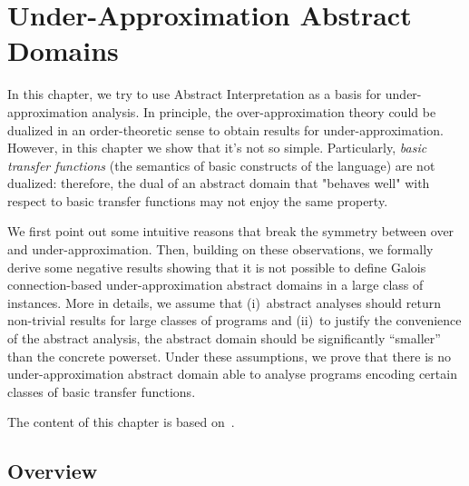 
\chapter{Under-Approximation Abstract Domains}\label{ch:uai}
In this chapter, we try to use Abstract Interpretation as a basis for under-approximation analysis. In principle, the over-approximation theory could be dualized in an order-theoretic sense to obtain results for under-approximation. However, in this chapter we show that it's not so simple. Particularly, \emph{basic transfer functions} (the semantics of basic constructs of the language) are not dualized: therefore, the dual of an abstract domain that "behaves well" with respect to basic transfer functions may not enjoy the same property.

We first point out some intuitive reasons that break the symmetry between over and under-approximation. Then, building on these observations, we formally derive some negative results showing that it is not possible to define Galois connection-based under-approximation abstract domains in a large class of instances. More in details, we assume that (i)~abstract analyses should return non-trivial results for large classes of programs and (ii)~to justify the convenience of the abstract analysis, the abstract domain should be significantly “smaller” than the concrete powerset. Under these assumptions, we prove that there is no under-approximation abstract domain able to analyse programs encoding certain classes of basic transfer functions.

The content of this chapter is based on~\cite{ABG22,ABG24}.

\section{Overview}

